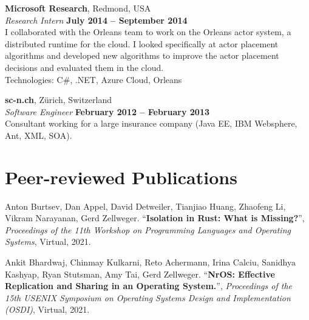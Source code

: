 \documentclass[margin,line]{cv/cv}
\begin{document}
\begin{resume}
    \textbf{Microsoft Research}, Redmond, USA \vspace{2mm}\\\vspace{1mm}%
    \textsl{Research Intern} \hfill \textbf{July 2014 -- September 2014}\\
    I collaborated with the Orleans team to work on the Orleans
    actor system, a distributed runtime for the cloud. I looked specifically at
    actor placement algorithms and developed new algorithms to improve the actor placement
    decisions and evaluated them in the cloud.\\ Technologies: C\#, .NET, Azure Cloud, Orleans

    \textbf{sc-n.ch}, Zürich, Switzerland \vspace{2mm}\\\vspace{1mm}%
    \textsl{Software Engineer} \hfill \textbf{February 2012 -- February 2013}\\
    Consultant working for a large insurance company (Java EE, IBM Websphere, Ant, XML, SOA).


    \pagebreak

    \section{\mysidestyle Peer-reviewed Publications}
    
    Anton Burtsev, Dan Appel, David Detweiler, Tianjiao Huang, Zhaofeng Li, Vikram Narayanan, Gerd Zellweger.
    ``\textbf{Isolation in Rust: What is Missing?}'', \textsl{Proceedings of the 11th Workshop on Programming Languages and Operating Systems}, Virtual, 2021.

    Ankit Bhardwaj, Chinmay Kulkarni, Reto Achermann, Irina Calciu, Sanidhya Kashyap, Ryan Stutsman, Amy Tai, Gerd Zellweger.
    ``\textbf{NrOS: Effective Replication and Sharing in an Operating System.}'', \textsl{Proceedings of the 15th USENIX Symposium on Operating Systems Design and Implementation (OSDI)}, Virtual, 2021.


\end{resume}
\end{document}
